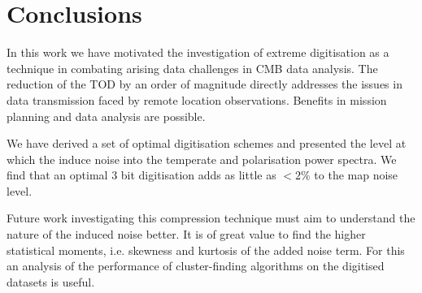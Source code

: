 \documentclass[apj]{emulateapj}
\begin{document}

\section{Conclusions}
\label{sec:conclusions}

In this work we have motivated the investigation of extreme digitisation as a technique in combating arising data challenges in CMB data analysis. The reduction of the TOD by an order of magnitude directly addresses the issues in data transmission faced by remote location observations. Benefits in mission planning and data analysis are possible.

We have derived a set of optimal digitisation schemes and presented the level at which the induce noise into the temperate and polarisation power spectra. We find that an optimal 3 bit digitisation adds as little as $<2\%$ to the map noise level.

Future work investigating this compression technique must aim to understand the nature of the induced noise better. It is of great value to find the higher statistical moments, i.e. skewness and kurtosis of the added noise term. For this an analysis of the performance of cluster-finding algorithms on the digitised datasets is useful.
\end{document}
